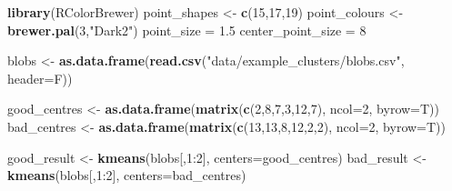 \documentclass[]{book}
\newenvironment{Shaded}{\begin{snugshade}}{\end{snugshade}}
\newcommand{\KeywordTok}[1]{\textcolor[rgb]{0.13,0.29,0.53}{\textbf{{#1}}}}
\newcommand{\DataTypeTok}[1]{\textcolor[rgb]{0.13,0.29,0.53}{{#1}}}
\newcommand{\DecValTok}[1]{\textcolor[rgb]{0.00,0.00,0.81}{{#1}}}
\newcommand{\FloatTok}[1]{\textcolor[rgb]{0.00,0.00,0.81}{{#1}}}
\newcommand{\StringTok}[1]{\textcolor[rgb]{0.31,0.60,0.02}{{#1}}}
\newcommand{\NormalTok}[1]{{#1}}
\theoremstyle{definition}
\theoremstyle{definition}
\theoremstyle{definition}
\theoremstyle{remark}
\begin{document}
\begin{Shaded}
\begin{Highlighting}[]
\KeywordTok{library}\NormalTok{(RColorBrewer)}
\NormalTok{point_shapes <-}\StringTok{ }\KeywordTok{c}\NormalTok{(}\DecValTok{15}\NormalTok{,}\DecValTok{17}\NormalTok{,}\DecValTok{19}\NormalTok{)}
\NormalTok{point_colours <-}\StringTok{ }\KeywordTok{brewer.pal}\NormalTok{(}\DecValTok{3}\NormalTok{,}\StringTok{"Dark2"}\NormalTok{)}
\NormalTok{point_size =}\StringTok{ }\FloatTok{1.5}
\NormalTok{center_point_size =}\StringTok{ }\DecValTok{8}

\NormalTok{blobs <-}\StringTok{ }\KeywordTok{as.data.frame}\NormalTok{(}\KeywordTok{read.csv}\NormalTok{(}\StringTok{"data/example_clusters/blobs.csv"}\NormalTok{, }\DataTypeTok{header=}\NormalTok{F))}

\NormalTok{good_centres <-}\StringTok{ }\KeywordTok{as.data.frame}\NormalTok{(}\KeywordTok{matrix}\NormalTok{(}\KeywordTok{c}\NormalTok{(}\DecValTok{2}\NormalTok{,}\DecValTok{8}\NormalTok{,}\DecValTok{7}\NormalTok{,}\DecValTok{3}\NormalTok{,}\DecValTok{12}\NormalTok{,}\DecValTok{7}\NormalTok{), }\DataTypeTok{ncol=}\DecValTok{2}\NormalTok{, }\DataTypeTok{byrow=}\NormalTok{T))}
\NormalTok{bad_centres <-}\StringTok{ }\KeywordTok{as.data.frame}\NormalTok{(}\KeywordTok{matrix}\NormalTok{(}\KeywordTok{c}\NormalTok{(}\DecValTok{13}\NormalTok{,}\DecValTok{13}\NormalTok{,}\DecValTok{8}\NormalTok{,}\DecValTok{12}\NormalTok{,}\DecValTok{2}\NormalTok{,}\DecValTok{2}\NormalTok{), }\DataTypeTok{ncol=}\DecValTok{2}\NormalTok{, }\DataTypeTok{byrow=}\NormalTok{T))}

\NormalTok{good_result <-}\StringTok{ }\KeywordTok{kmeans}\NormalTok{(blobs[,}\DecValTok{1}\NormalTok{:}\DecValTok{2}\NormalTok{], }\DataTypeTok{centers=}\NormalTok{good_centres)}
\NormalTok{bad_result <-}\StringTok{ }\KeywordTok{kmeans}\NormalTok{(blobs[,}\DecValTok{1}\NormalTok{:}\DecValTok{2}\NormalTok{], }\DataTypeTok{centers=}\NormalTok{bad_centres)}


\end{Highlighting}
\end{Shaded}
\end{document}
